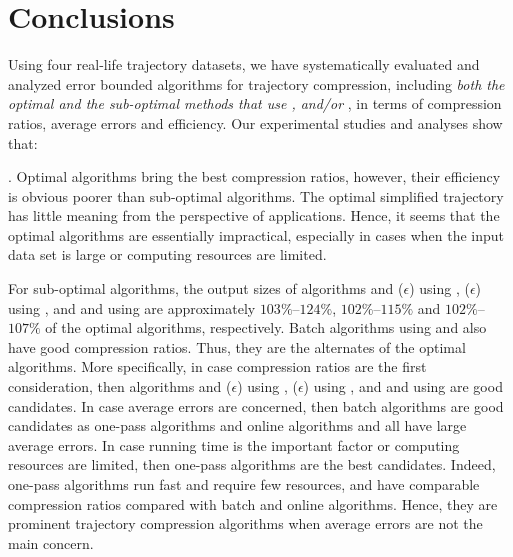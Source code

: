 \vspace{-1ex}
\section{Conclusions}

Using four real-life trajectory datasets, we have systematically evaluated and analyzed error bounded \lsa algorithms for trajectory compression, including \emph{both the optimal and the sub-optimal methods that use \ped, \sed and/or \dad},  in terms of compression ratios, average errors and efficiency.
Our experimental studies and analyses show that:


. Optimal algorithms bring the best compression ratios, however, their efficiency is obvious poorer than sub-optimal algorithms. The optimal simplified trajectory has little meaning from the perspective of applications. Hence, it seems that the optimal algorithms are essentially impractical, especially in cases when the input data set is large or computing resources are limited.

For sub-optimal algorithms, the output sizes of algorithms \bqsa and \siped($\epsilon$) using \ped, \cised($\epsilon$) using \sed, and \tpa and \interval using \dad are approximately $103\%$--$124\%$, $102\%$--$115\%$ and $102\%$--$107\%$ of the optimal algorithms, respectively. Batch algorithms using \ped and \sed also have good compression ratios. Thus, they are the alternates of the optimal algorithms.
%
More specifically, in case compression ratios are the first consideration, then algorithms \bqsa and \siped($\epsilon$) using \ped, \cised($\epsilon$) using \sed, and \tpa and \interval using \dad are good candidates.
%
In case average errors are concerned, then batch algorithms are good candidates as one-pass algorithms and online algorithms \opwa and \bqsa all have large average errors. %
%
In case running time is the important factor or computing resources are limited, then one-pass algorithms are the best candidates.
%
Indeed, one-pass algorithms run fast and require few resources, and have comparable compression ratios compared with batch and online algorithms. Hence, they are prominent trajectory compression algorithms when average errors are not the main concern.

